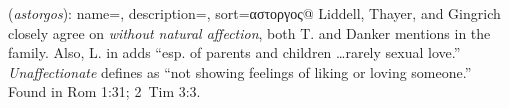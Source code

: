 \item[Unaffectionate (of family),]

(\textit{astorgos}):
{
    name=,
    description={},
    sort=αστοργος@
}
Liddell, Thayer, and Gingrich closely agree on \emph{without natural affection}, both T. and Danker mentions in the family. Also, L. in  adds ``esp. of parents and children \ldots rarely sexual love.'' \emph{Unaffectionate} defines as ``not showing feelings of liking or loving someone.''
Found in Rom 1:31; 2~Tim 3:3.
